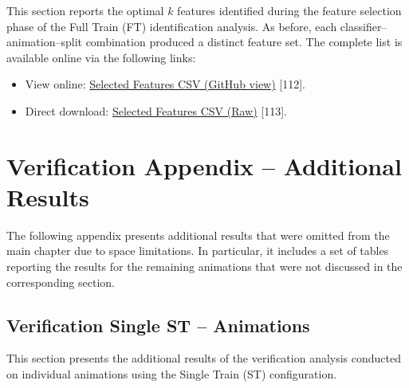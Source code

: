 \documentclass{article}
\begin{document}
This section reports the optimal $k$ features identified during the feature selection phase of the Full Train (FT) identification analysis.
As before, each classifier–animation–split combination produced a distinct feature set.
The complete list is available online via the following links:

\begin{itemize}
    \item View online: 
    \href{https://github.com/DavideMascheroni99/movingText/blob/main/Programs/Machine_Learning/Machine_Learning_results/Identification_single_results/selected_features_ft.csv}
    {Selected Features CSV (GitHub view)} [112].
    \item Direct download: 
    \href{https://github.com/DavideMascheroni99/movingText/raw/main/Programs/Machine_Learning/Machine_Learning_results/Identification_single_results/selected_features_ft.csv}
    {Selected Features CSV (Raw)} [113].
\end{itemize}
\FloatBarrier

\section{Verification Appendix – Additional Results}

The following appendix presents additional results that were omitted from the main chapter due to space limitations. 
In particular, it includes a set of tables reporting the results for the remaining animations that were not discussed in the corresponding section.

\subsection{Verification Single ST – Animations}
\label{subsec:vs_st_a}

This section presents the additional results of the verification analysis conducted on individual animations using the Single Train (ST) configuration.
\end{document}
